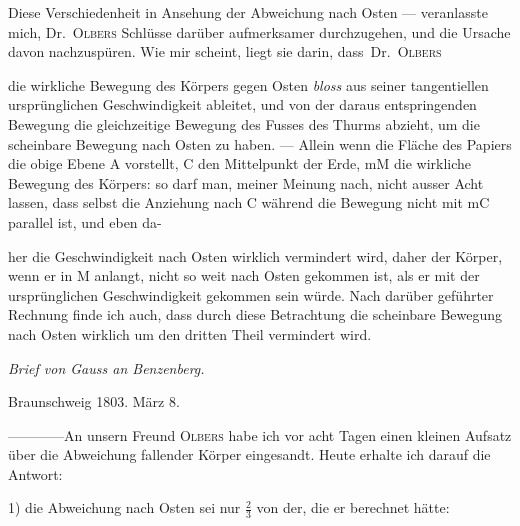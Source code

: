 Diese Verschiedenheit in Ansehung der Abweichung nach Osten — veranlasste mich, Dr.\ \textsc{Olbers} Schlüsse darüber aufmerksamer durchzugehen, und die Ursache davon nachzuspüren. Wie mir scheint, liegt sie darin, \mbox{dass Dr.\ \textsc{Olbers}}
\par\noindent
\begin{minipage}[t]{.24\linewidth}
\vspace{.38\baselineskip}
\centering\resizebox{!}{44mm}{}
\end{minipage}\hfill
\begin{minipage}[t]{.73\linewidth}
\vspace{0pt}
\noindent die wirkliche Bewegung des Körpers gegen Osten \textit{bloss} aus seiner tangentiellen ursprünglichen Geschwindigkeit ableitet, und von der daraus entspringenden Bewegung die gleichzeitige Bewegung des Fusses des Thurms abzieht, um die scheinbare Bewegung nach Osten zu haben. — Allein wenn die Fläche des Papiers die obige Ebene $\mathrm{A}$ vorstellt, $\mathrm{C}$ den Mittelpunkt der Erde, $\mathrm{mM}$ die wirkliche Bewegung des Körpers: so darf man, meiner Meinung nach, nicht ausser Acht lassen, dass selbst die Anziehung nach $\mathrm{C}$ während die Bewegung nicht mit $\mathrm{mC}$ parallel ist, und eben da-
\end{minipage}
\par\clearpage
{}
\noindent her die Geschwindigkeit nach Osten wirklich vermindert wird, daher der Körper, wenn er in $\mathrm{M}$ anlangt, nicht so weit nach Osten gekommen ist, als er mit der ursprünglichen Geschwindigkeit gekommen sein würde. Nach darüber geführter Rechnung finde ich auch, dass durch diese Betrachtung die scheinbare Bewegung nach Osten wirklich um den dritten Theil vermindert wird.

\begin{center}{\large\itshape Brief von Gauss an Benzenberg.}\end{center}
\noindent\hfill{\small Braunschweig 1803. März 8.}\hspace*{.06\linewidth}\par
—\quad—\quad—\quad—\quad An unsern Freund \textsc{Olbers} habe ich vor acht Tagen einen kleinen Aufsatz über die Abweichung fallender Körper eingesandt. Heute erhalte ich darauf die Antwort:

1) die Abweichung nach Osten sei nur $\tfrac23$ von der, die er berechnet hätte:

